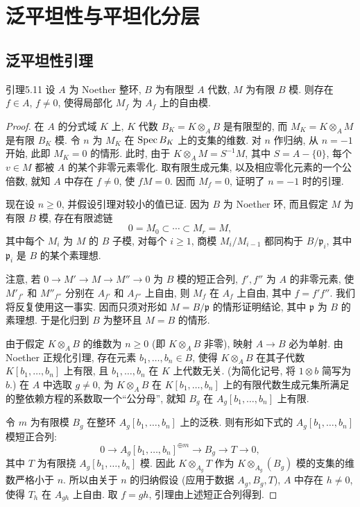 \section{泛平坦性与平坦化分层}\label{ch05:sec5.4}
\subsection{泛平坦性引理}\label{ch05:sec5.4.1}
\begin{origstatement}{引理}{5.11}\label{ch05:lem5.11}
设 $A$ 为 Noether 整环, $B$ 为有限型 $A$ 代数, $M$ 为有限 $B$ 模. 则存在 $f\in A$, $f\neq0$, 使得局部化 $M_f$ 为 $A_f$ 上的自由模.
\end{origstatement}
\begin{proof}
在 $A$ 的分式域 $K$ 上, $K$ 代数 $B_K=K\otimes_A B$ 是有限型的, 而 $M_K=K\otimes_A M$ 是有限 $B_K$ 模. 令 $n$ 为 $M_K$ 在 $\operatorname{Spec} B_K$ 上的支集的维数. 对 $n$ 作归纳, 从 $n=-1$ 开始, 此即 $M_K=0$ 的情形. 此时, 由于 $K\otimes_A M=S^{-1}M$, 其中 $S=A-\{0\}$, 每个 $v\in M$ 都被 $A$ 的某个非零元素零化. 取有限生成元集, 以及相应零化元素的一个公倍数, 就知 $A$ 中存在 $f\neq0$, 使 $fM=0$. 因而 $M_f=0$, 证明了 $n=-1$ 时的引理.

现在设 $n\geq0$, 并假设引理对较小的值已证. 因为 $B$ 为 Noether 环, 而且假定 $M$ 为有限 $B$ 模, 存在有限滤链
\[
 0=M_0\subset\cdots\subset M_r=M,
\]
其中每个 $M_i$ 为 $M$ 的 $B$ 子模, 对每个 $i\geq1$, 商模 $M_i/M_{i-1}$ 都同构于 $B/\mathfrak p_i$, 其中 $\mathfrak p_i$ 是 $B$ 的某个素理想.

注意, 若 $0\to M'\to M\to M''\to0$ 为 $B$ 模的短正合列, $f',f''$ 为 $A$ 的非零元素, 使 $M'_{f'}$ 和 $M''_{f''}$ 分别在 $A_{f'}$ 和 $A_{f''}$ 上自由, 则 $M_f$ 在 $A_f$ 上自由, 其中 $f=f'f''$. 我们将反复使用这一事实. 因而只须对形如 $M=B/\mathfrak p$ 的情形证明结论, 其中 $\mathfrak p$ 为 $B$ 的素理想. 于是化归到 $B$ 为整环且 $M=B$ 的情形.

由于假定 $K\otimes_A B$ 的维数为 $n\geq0$ (即 $K\otimes_A B$ 非零), 映射 $A\to B$ 必为单射. 由 Noether 正规化引理, 存在元素 $b_1,\ldots,b_n\in B$, 使得 $K\otimes_A B$ 在其子代数 $K[b_1,\ldots,b_n]$ 上有限, 且 $b_1,\ldots,b_n$ 在 $K$ 上代数无关. (为简化记号, 将 $1\otimes b$ 简写为 $b$.) 在 $A$ 中选取 $g\neq0$, 为 $K\otimes_A B$ 在 $K[b_1,\ldots,b_n]$ 上的有限代数生成元集所满足的整依赖方程的系数取一个“公分母”, 就知 $B_g$ 在 $A_g[b_1,\ldots,b_n]$ 上有限.

令 $m$ 为有限模 $B_g$ 在整环 $A_g[b_1,\ldots,b_n]$ 上的泛秩. 则有形如下式的 $A_g[b_1,\ldots,b_n]$ 模短正合列:
\[
 0\longrightarrow A_g[b_1,\ldots,b_n]^{\oplus m}\longrightarrow B_g\longrightarrow T\longrightarrow0,
\]
其中 $T$ 为有限挠 $A_g[b_1,\ldots,b_n]$ 模. 因此 $K\otimes_{A_g}T$ 作为 $K\otimes_{A_g}(B_g)$ 模的支集的维数严格小于 $n$.
所以由关于 $n$ 的归纳假设 (应用于数据 $A_g,B_g,T$), $A$ 中存在 $h\neq0$, 使得 $T_h$ 在 $A_{gh}$ 上自由. 取 $f=gh$, 引理由上述短正合列得到.
\end{proof}

